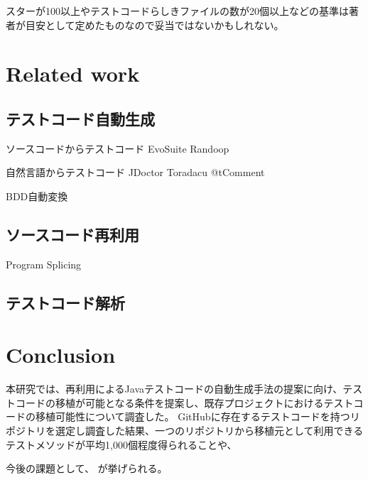 \documentclass[conference]{IEEEtran}
\begin{document}
スターが100以上やテストコードらしきファイルの数が20個以上などの基準は著者が目安として定めたものなので妥当ではないかもしれない。

\section{Related work}
\subsection{テストコード自動生成}
ソースコードからテストコード
EvoSuite\cite{Fraser2013}
Randoop\cite{Pacheco2007}

自然言語からテストコード
JDoctor\cite{Arianna2018}
Toradacu\cite{Alberto2016}
@tComment\cite{Tan2012}

BDD自動変換

\subsection{ソースコード再利用}
Program Splicing\cite{Lu2018}
\subsection{テストコード解析}

\section{Conclusion}
本研究では、再利用によるJavaテストコードの自動生成手法の提案に向け、テストコードの移植が可能となる条件を提案し、既存プロジェクトにおけるテストコードの移植可能性について調査した。
GitHubに存在するテストコードを持つリポジトリを選定し調査した結果、一つのリポジトリから移植元として利用できるテストメソッドが平均1,000個程度得られることや、

今後の課題として、
が挙げられる。




\end{document}
